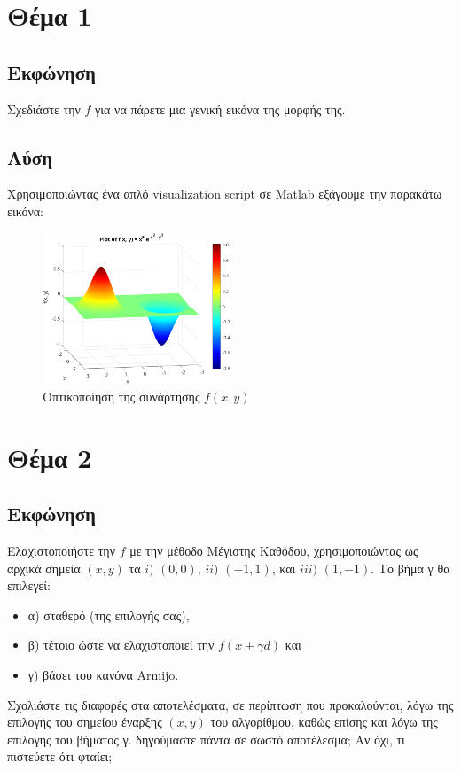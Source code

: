 \documentclass{report}
\begin{document}
\chapter{Θέμα 1}
\section{Εκφώνηση}
Σχεδιάστε την $f$ για να πάρετε μια γενική εικόνα της μορφής της.
\section{Λύση}
Χρησιμοποιώντας ένα απλό visualization script
σε
Matlab
εξάγουμε την παρακάτω εικόνα:
\begin{figure}[H]
    \centering
    \includegraphics[width=0.5\textwidth]{media/visualization.png}
    \caption{Οπτικοποίηση της συνάρτησης $f(x,y)$}
\end{figure}

\chapter{Θέμα 2}
\section{Εκφώνηση}
Ελαχιστοποιήστε την $f$ με την μέθοδο Μέγιστης Καθόδου, χρησιμοποιώντας ως αρχικά σημεία 
$(x, y)$ τα $i)$ $(0,0)$, $ii)$ $(-1,1)$, και $iii)$ $(1,-1)$. Το βήμα γ θα επιλεγεί: 
\begin{itemize}
    \item α) σταθερό (της επιλογής σας), 
    \item β) τέτοιο ώστε να ελαχιστοποιεί την $f(x + γd)$ και 
    \item γ) βάσει του κανόνα Armijo.
\end{itemize}
Σχολιάστε τις διαφορές στα αποτελέσματα, σε περίπτωση που προκαλούνται, λόγω της επιλογής του 
σημείου έναρξης $(x, y)$ του αλγορίθμου, καθώς επίσης και λόγω της επιλογής του βήματος γ.
δηγούμαστε πάντα σε σωστό αποτέλεσμα; Αν όχι, τι πιστεύετε ότι φταίει;
\end{document}
